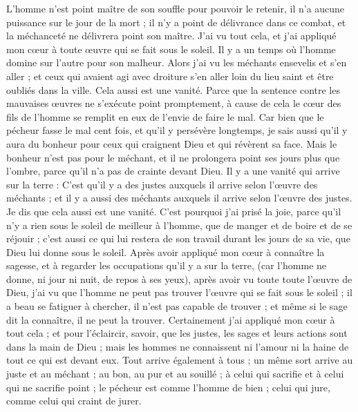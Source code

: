 \begin{multicols}{2}
L'homme n'est point maître de son souffle pour pouvoir le retenir, il n'a aucune puissance sur le jour de la mort ; il n'y a point de délivrance dans ce combat, et la méchanceté ne délivrera point son maître.
J'ai vu tout cela, et j'ai appliqué mon cœur à toute œuvre qui se fait sous le soleil. Il y a un temps où l'homme domine sur l'autre pour son malheur.
Alors j'ai vu les méchants ensevelis et s'en aller ; et ceux qui avaient agi avec droiture s'en aller loin du lieu saint et être oubliés dans la ville. Cela aussi est une vanité.
Parce que la sentence contre les mauvaises œuvres ne s'exécute point promptement, à cause de cela le cœur des fils de l'homme se remplit en eux de l'envie de faire le mal.
Car bien que le pécheur fasse le mal cent fois, et qu'il y persévère longtemps, je sais aussi qu'il y aura du bonheur pour ceux qui craignent Dieu et qui révèrent sa face.
Mais le bonheur n'est pas pour le méchant, et il ne prolongera point ses jours plus que l'ombre, parce qu'il n'a pas de crainte devant Dieu.
Il y a une vanité qui arrive sur la terre : C'est qu'il y a des justes auxquels il arrive selon l'œuvre des méchants ; et il y a aussi des méchants auxquels il arrive selon l'œuvre des justes. Je dis que cela aussi est une vanité.
C'est pourquoi j'ai prisé la joie, parce qu'il n'y a rien sous le soleil de meilleur à l'homme, que de manger et de boire et de se réjouir ; c'est aussi ce qui lui restera de son travail durant les jours de sa vie, que Dieu lui donne sous le soleil. 
Après avoir appliqué mon cœur à connaître la sagesse, et à regarder les occupations qu'il y a sur la terre, (car l'homme ne donne, ni jour ni nuit, de repos à ses yeux), 
après avoir vu toute toute l'œuvre de Dieu, j'ai vu que l'homme ne peut pas trouver l'œuvre qui se fait sous le soleil ; il a beau se fatiguer à chercher, il n'est pas capable de trouver ; et même si le sage dit la connaître, il ne peut la trouver.
\VerseOne{}Certainement j'ai appliqué mon cœur à tout cela ; et pour l'éclaircir, savoir, que les justes, les sages et leurs actions sont dans la main de Dieu ; mais les hommes ne connaissent ni l'amour ni la haine de tout ce qui est devant eux. 
Tout arrive également à tous ; un même sort arrive au juste et au méchant ; au bon, au pur et au souillé ; à celui qui sacrifie et à celui qui ne sacrifie point ; le pécheur est comme l'homme de bien ; celui qui jure, comme celui qui craint de jurer. 

\end{multicols}
